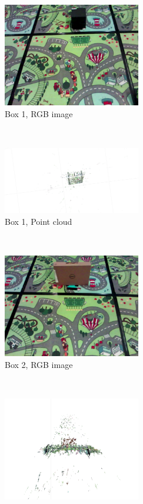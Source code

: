 \documentclass[12pt,a4paper]{article}
\begin{document}
    \begin{figure}[p]
      \begin{subfigure}[t]{0.5\textwidth}
      \centering
        \includegraphics[width=60mm]{box_test/cpp-headless-output-118_4_16_1_57_40_1526435860119.png}
      \caption{Box 1, RGB image}
      \end{subfigure}%
      ~
      \begin{subfigure}[t]{0.5\textwidth}
      \centering
        \includegraphics[width=60mm, trim =230mm 100mm 200mm 70mm, clip]{box_test/no_vicon1_36.png}
      \caption{Box 1, Point cloud}
      \end{subfigure}
      \\
      \begin{subfigure}[t]{0.5\textwidth}
      \centering
        \includegraphics[width=60mm]{box_test/cpp-headless-output-118_4_16_1_59_18_1526435958825.png}
      \caption{Box 2, RGB image}
      \end{subfigure} %
       ~
      \begin{subfigure}[t]{0.5\textwidth}
      \centering
        \includegraphics[width=60mm, trim =50mm 50mm 50mm 20mm, clip]{box_test/no_vicon1_161.png}

\end{subfigure}
\end{figure}
\end{document}
